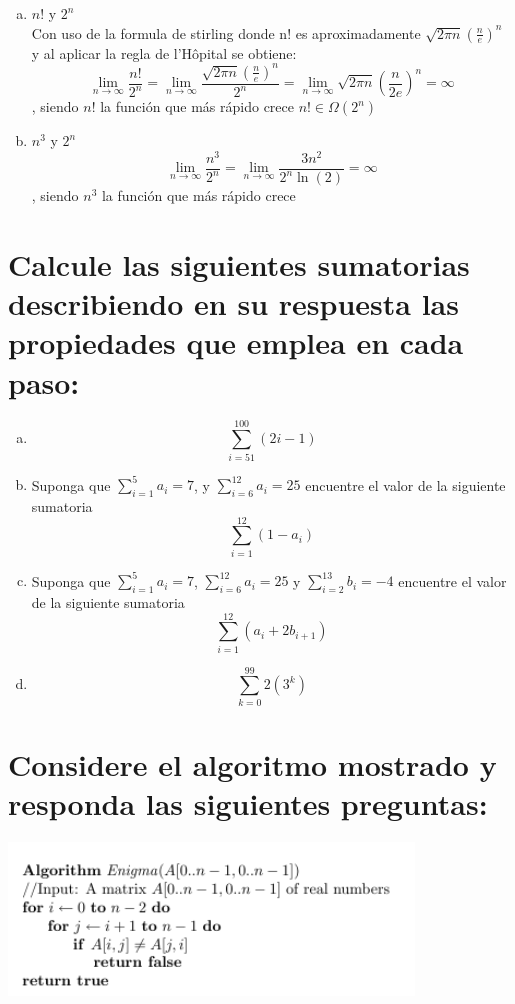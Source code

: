 \documentclass{article}
\begin{document}
\begin{enumerate}[(a)]
\item $n!$ y $2^{n}$ \\ Con uso de la formula de stirling donde n! es aproximadamente $\sqrt{2\pi n}(\frac{n}{e})^n$ y al aplicar la regla de l'Hôpital se obtiene:
  \[ \lim_{n\to\infty} \frac{n!}{2^{n}} = \lim_{n\to\infty} \frac{\sqrt{2\pi n} (\frac{n}{e})^n}{2^{n}} = \lim_{n\to\infty} \sqrt{2\pi n}(\frac{n}{2e})^{n} = \infty\], siendo $n!$ la función que más rápido crece $n! \in \Omega(2^{n})$
\item $n^{3}$ y $2^{n}$\\
  \[ \lim_{n\to\infty} \frac{n^{3}}{2^{n}} = \lim_{n\to\infty} \frac{3n^2}{2^{n}\ln (2)} = \infty \], siendo $n^{3}$ la función que más rápido crece
\end{enumerate}

\newpage
\section{Calcule las siguientes sumatorias describiendo en su respuesta las propiedades que emplea en cada paso:}

\begin{enumerate}[(a)]
\item $$ \sum_{i=51}^{100} \left(2i - 1\right)$$
\item Suponga que $\sum_{i=1}^{5} a_{i}=7$, y $\sum_{i=6}^{12} a_{i}=25$ encuentre el valor de la siguiente sumatoria
  $$\sum_{i=1}^{12} \left(1-a_{i}\right)$$
\item Suponga que $ \sum_{i=1}^{5} a_{i}=7$, $\sum_{i=6}^{12} a_{i}=25$ y $\sum_{i=2}^{13} b_{i} = -4$ encuentre el valor de la siguiente sumatoria $$\sum_{i=1}^{12}\left(a_{i}+2b_{i+1}\right)$$
\item $$ \sum_{k=0}^{99} 2(3^{k})$$
\end{enumerate}

\newpage
\section{Considere el algoritmo mostrado y responda las siguientes preguntas:}

\includegraphics[scale=0.7]{algo.png}
\end{document}
